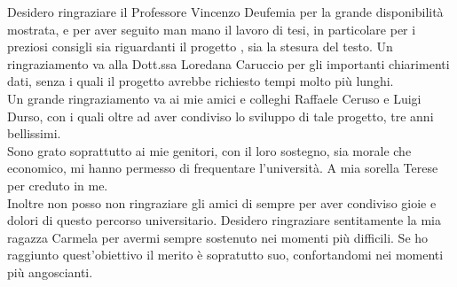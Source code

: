 Desidero ringraziare il Professore Vincenzo Deufemia per la grande disponibilità mostrata, e per aver seguito man mano il lavoro di tesi, in particolare
per i preziosi consigli sia riguardanti il progetto , sia la stesura del testo.
Un ringraziamento va alla Dott.ssa Loredana Caruccio per gli importanti
chiarimenti dati, senza i quali il progetto avrebbe richiesto tempi molto più lunghi.\\
Un grande ringraziamento va ai mie amici e colleghi Raffaele Ceruso e Luigi Durso, con i quali oltre ad aver condiviso lo sviluppo di tale progetto, tre anni bellissimi.\\
Sono grato soprattutto ai mie genitori, con il loro sostegno, sia morale che economico, mi hanno permesso di frequentare l'università.
A mia sorella Terese per creduto in me.\\
Inoltre non posso non ringraziare gli amici di sempre per aver condiviso gioie e dolori di questo percorso universitario.
Desidero ringraziare sentitamente la mia ragazza Carmela per avermi sempre sostenuto nei momenti più difficili. Se ho raggiunto quest'obiettivo il merito è sopratutto suo, confortandomi nei momenti più angoscianti. 